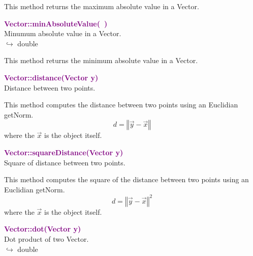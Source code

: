 This method returns the maximum absolute value in a Vector.

\textcolor{purple}{\textbf{Vector::minAbsoluteValue(~)}}\label{Vector::minAbsoluteValue()}\\
Minumum absolute value in a Vector.\\ \hspace*{10mm}$\hookrightarrow$ double

This method returns the minimum absolute value in a Vector.

\textcolor{purple}{\textbf{Vector::distance(Vector y)}}\label{Vector::distance(Vector y)}\\
Distance between two points.

This method computes the distance between two points using an Euclidian getNorm.
\begin{equation*}
d = \left\Vert \overrightarrow{y} - \overrightarrow{x} \right\Vert
\end{equation*}
where the $\overrightarrow{x}$ is the object itself.

\textcolor{purple}{\textbf{Vector::squareDistance(Vector y)}}\label{Vector::squareDistance(Vector y)}\\
Square of distance between two points.

This method computes the square of the distance between two points using an Euclidian getNorm.
\begin{equation*}
d = {\left\Vert \overrightarrow{y} - \overrightarrow{x} \right\Vert}^2
\end{equation*}
where the $\overrightarrow{x}$ is the object itself.

\textcolor{purple}{\textbf{Vector::dot(Vector y)}}\label{Vector::dot(Vector y)}\\
Dot product of two Vector.\\ \hspace*{10mm}$\hookrightarrow$ double

